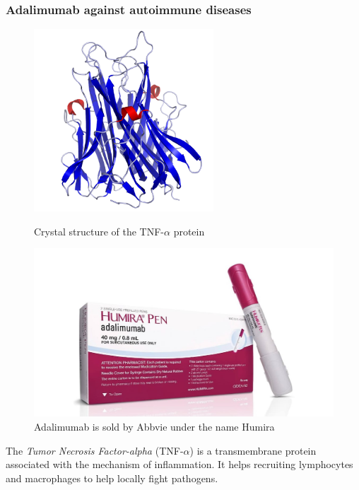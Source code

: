 \subsubsection{Adalimumab against autoimmune diseases}
\begin{figure}[H]
    \begin{minipage}{0.49\textwidth}
            \centering
            \includegraphics[width=0.6\textwidth]{../Images/TNFa_Crystal_Structure.rsh.png}
            \caption{Crystal structure of the TNF-$\alpha$ protein}
            \label{fig:TNFa_Crystal_Structure}
    \end{minipage}\hfill
    \begin{minipage}{0.49\textwidth}
            \centering
            \includegraphics[width=\textwidth]{../Images/humira.jpg}   
            \caption{Adalimumab is sold by Abbvie under the name Humira \cite{noauthor_humira_nodate-1}}
            \label{fig:humira}
    \end{minipage}
\end{figure}

The \emph{Tumor Necrosis Factor-alpha} (TNF-$\alpha$) is a transmembrane protein
associated with the mechanism of inflammation. It helps recruiting lymphocytes
and macrophages to help locally fight pathogens.

